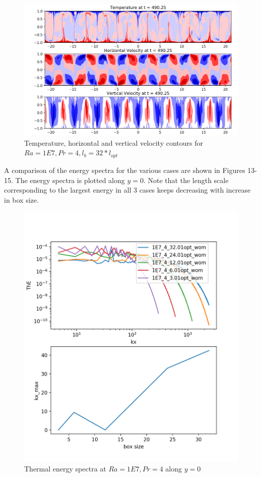 \documentclass[12pt]{article}
\begin{document}
   \begin{figure}[!htb]
   	\includegraphics[width=\linewidth]{contours_1E7_4_32.png}
   	\caption{Temperature, horizontal and vertical velocity contours for $Ra = 1E7, Pr =4, l_b = 32* l_{opt} $ }
   	\label{fig:fig12}
   \end{figure}

A comparison of the energy spectra for the various cases are shown in Figures 13-15. The energy spectra is plotted along $y = 0$. Note that the length scale corresponding to the largest energy in all 3 cases keeps decreasing with increase in box size.

  \begin{figure}[!htb]
  	\includegraphics[width=\linewidth]{1E7_4_ThE.png}
  	\caption{ Thermal energy spectra at $Ra = 1E7, Pr =4$ along $y = 0$}
  	\label{fig:fig13}
  \end{figure}
\end{document}
